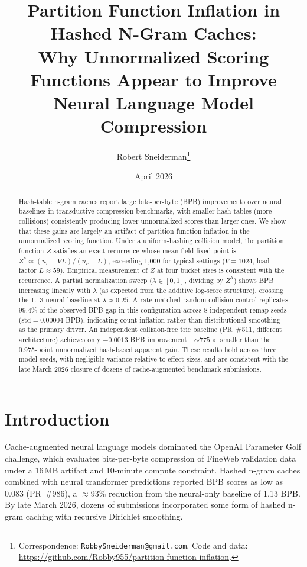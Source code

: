 \documentclass[11pt]{article}
\title{Partition Function Inflation in Hashed N-Gram Caches:\\Why Unnormalized Scoring Functions Appear to Improve\\Neural Language Model Compression}
\author{Robert Sneiderman\thanks{Correspondence: \texttt{RobbySneiderman@gmail.com}. Code and data: \url{https://github.com/Robby955/partition-function-inflation}.}}
\date{April 2026}
\begin{document}
\maketitle

\begin{abstract}
Hash-table n-gram caches report large bits-per-byte (BPB) improvements over neural baselines in transductive compression benchmarks, with smaller hash tables (more collisions) consistently producing lower unnormalized scores than larger ones. We show that these gains are largely an artifact of partition function inflation in the unnormalized scoring function. Under a uniform-hashing collision model, the partition function $Z$ satisfies an exact recurrence whose mean-field fixed point is $Z^* \approx (n_c + VL)/(n_c + L)$, exceeding 1,000 for typical settings ($V{=}1024$, load factor $L{\approx}59$). Empirical measurement of $Z$ at four bucket sizes is consistent with the recurrence. A partial normalization sweep ($\lambda \in [0, 1]$, dividing by $Z^\lambda$) shows BPB increasing linearly with $\lambda$ (as expected from the additive log-score structure), crossing the 1.13 neural baseline at $\lambda \approx 0.25$. A rate-matched random collision control replicates 99.4\% of the observed BPB gap in this configuration across 8 independent remap seeds ($\text{std} = 0.00004$ BPB), indicating count inflation rather than distributional smoothing as the primary driver. An independent collision-free trie baseline (PR~\#511, different architecture) achieves only $-0.0013$ BPB improvement---${\sim}775\times$ smaller than the 0.975-point unnormalized hash-based apparent gain. These results hold across three model seeds, with negligible variance relative to effect sizes, and are consistent with the late March 2026 closure of dozens of cache-augmented benchmark submissions.
\end{abstract}

\section{Introduction}

Cache-augmented neural language models dominated the OpenAI Parameter Golf challenge, which evaluates bits-per-byte compression of FineWeb validation data under a 16\,MB artifact and 10-minute compute constraint. Hashed n-gram caches combined with neural transformer predictions reported BPB scores as low as 0.083 (PR~\#986), a ${\approx}$93\% reduction from the neural-only baseline of 1.13 BPB. By late March 2026, dozens of submissions incorporated some form of hashed n-gram caching with recursive Dirichlet smoothing.
\end{document}
